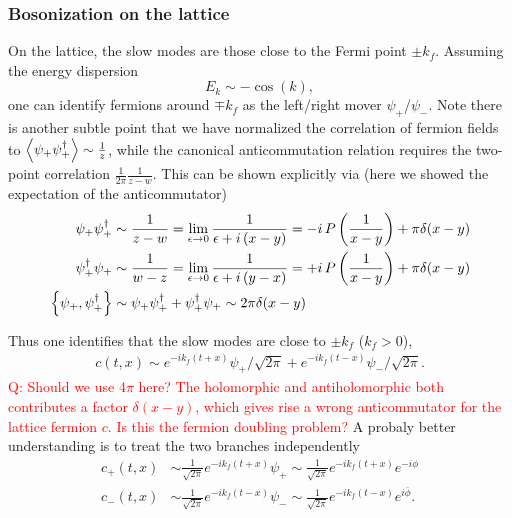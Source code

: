 \subsubsection{Bosonization on the lattice} 
On the lattice, the slow modes are those close to the Fermi point $\pm k_f$. Assuming the energy dispersion 
\begin{equation}
	E_k \sim -\cos (k),
\end{equation}
one can identify fermions around $\mp k_f$ as the left/right mover $\psi_{+}$/$\psi_{-}$. Note there is another subtle point that we have normalized the correlation of fermion fields to $\expval{\psi_{+}\psi_{+}^\dagger} \sim \frac{1}{z}$, while the canonical anticommutation relation requires the two-point correlation $\frac{1}{2\pi}\frac{1}{z-w}$. This can be shown explicitly via (here we showed the expectation of the anticommutator)
\begin{equation}
	\begin{aligned}
		\psi_{+}\psi_{+}^\dagger & \sim \frac{1}{z-w} = \lim_{\epsilon\rightarrow 0} \frac{1}{\epsilon + i\left(x-y\right)} = -i\,P\left(\frac{1}{x-y}\right) + \pi \delta(x-y)\\
		\psi_{+}^\dagger\psi_{+} & \sim \frac{1}{w-z} = \lim_{\epsilon\rightarrow 0} \frac{1}{\epsilon + i\left(y-x\right)} = +i\,P\left(\frac{1}{x-y}\right) + \pi \delta(x-y)\\
		\anticommutator{\psi_{+}}{\psi_{+}^\dagger} & \sim \psi_{+}\psi_{+}^\dagger + \psi_{+}^\dagger\psi_{+} \sim 2\pi \delta(x-y)
	\end{aligned}
\end{equation}


Thus one identifies that the slow modes are close to $\pm k_f$ ($k_f > 0$),
\begin{equation}
	\begin{aligned}
		c\left(t,x\right) \sim e^{-ik_f \left( t+x \right)} \psi_{+}/\sqrt{2\pi} + e^{-ik_f\left(t-x\right)} \psi_{-}/\sqrt{2\pi}.
	\end{aligned}
\end{equation} 
\textcolor{red}{Q: Should we use $4\pi$ here? The holomorphic and antiholomorphic both contributes a factor $\delta(x-y)$, which gives rise a wrong anticommutator for the lattice fermion $c$. Is this the fermion doubling problem?} A probaly better understanding is to treat the two branches independently
\begin{equation}
	\begin{aligned}
		c_{+}\left(t,x\right) &\sim \frac{1}{\sqrt{2\pi}}e^{-ik_f \left( t+x \right)} \psi_{+} \sim \frac{1}{\sqrt{2\pi}}e^{-ik_f \left( t+x \right)} e^{-i\phi} \\
		c_{-}\left(t,x\right) &\sim \frac{1}{\sqrt{2\pi}}e^{-ik_f\left(t-x\right)} \psi_{-} \sim \frac{1}{\sqrt{2\pi}}e^{-ik_f\left(t-x\right)} e^{i\bar{\phi}}.
	\end{aligned}
\end{equation}


